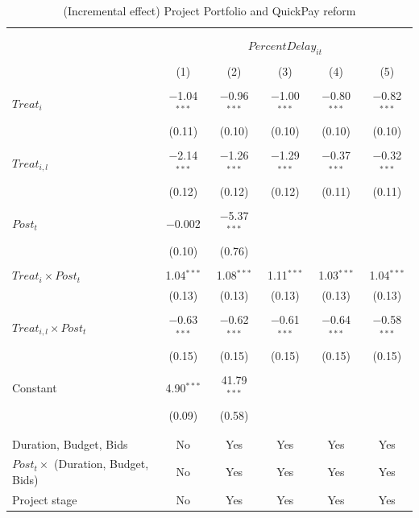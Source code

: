 \documentclass[
]{article}
\begin{document}
\begin{table}[H] \centering 
  \caption{(Incremental effect) Project Portfolio and QuickPay reform} 
  \label{} 
\small 
\begin{tabular}{@{\extracolsep{-2pt}}lccccc} 
\\[-1.8ex]\hline 
\hline \\[-1.8ex] 
\\[-1.8ex] & \multicolumn{5}{c}{$PercentDelay_{it}$  } \\ 
\\[-1.8ex] & (1) & (2) & (3) & (4) & (5)\\ 
\hline \\[-1.8ex] 
 $Treat_i$ & $-$1.04$^{***}$ & $-$0.96$^{***}$ & $-$1.00$^{***}$ & $-$0.80$^{***}$ & $-$0.82$^{***}$ \\ 
  & (0.11) & (0.10) & (0.10) & (0.10) & (0.10) \\ 
  & & & & & \\ 
 $Treat_{i,l}$ & $-$2.14$^{***}$ & $-$1.26$^{***}$ & $-$1.29$^{***}$ & $-$0.37$^{***}$ & $-$0.32$^{***}$ \\ 
  & (0.12) & (0.12) & (0.12) & (0.11) & (0.11) \\ 
  & & & & & \\ 
 $Post_t$ & $-$0.002 & $-$5.37$^{***}$ &  &  &  \\ 
  & (0.10) & (0.76) &  &  &  \\ 
  & & & & & \\ 
 $Treat_i \times Post_t$ & 1.04$^{***}$ & 1.08$^{***}$ & 1.11$^{***}$ & 1.03$^{***}$ & 1.04$^{***}$ \\ 
  & (0.13) & (0.13) & (0.13) & (0.13) & (0.13) \\ 
  & & & & & \\ 
 $Treat_{i,l} \times Post_t$ & $-$0.63$^{***}$ & $-$0.62$^{***}$ & $-$0.61$^{***}$ & $-$0.64$^{***}$ & $-$0.58$^{***}$ \\ 
  & (0.15) & (0.15) & (0.15) & (0.15) & (0.15) \\ 
  & & & & & \\ 
 Constant & 4.90$^{***}$ & 41.79$^{***}$ &  &  &  \\ 
  & (0.09) & (0.58) &  &  &  \\ 
  & & & & & \\ 
\hline \\[-1.8ex] 
Duration, Budget, Bids & No & Yes & Yes & Yes & Yes \\ 
$Post_t \times $  (Duration, Budget, Bids) & No & Yes & Yes & Yes & Yes \\ 
Project stage & No & Yes & Yes & Yes & Yes \\ 

\end{tabular}
\end{table}
\end{document}
